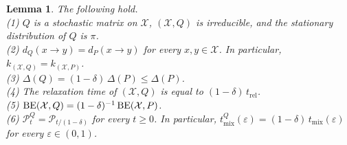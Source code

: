 \documentclass[a4paper, reqno, 11pt]{amsart}
\newtheorem{Lem}[Thm]{Lemma}
\theoremstyle{definition}
\begin{document}
\begin{Lem}\label{lem:lazy-comparison}
The following hold.\\
(1) $Q$ is a stochastic matrix on $\mathcal{X}$, $(\mathcal{X}, Q)$ is irreducible, and the stationary distribution of $Q$ is $\pi$.\\
(2) $d_{Q}(x \to y) = d_{P}(x \to y)$ for every $x, y \in \mathcal{X}$. In particular, $k_{(\mathcal{X}, Q)} = k_{(\mathcal{X}, P)}$.\\
(3) $\Delta(Q) = (1-\delta)\,\Delta(P) \le \Delta(P)$.\\
(4) The relaxation time of $(\mathcal{X}, Q)$ is equal to $(1-\delta)\,t_{\mathrm{rel}}$.\\
(5) $\textup{BE}(\mathcal{X}, Q) = (1-\delta)^{-1}\,\textup{BE}(\mathcal{X}, P)$.\\
(6) $\mathscr{P}_t^{Q} = \mathscr{P}_{t/(1-\delta)}$ for every $t \ge 0$. In particular, $t_{\mathrm{mix}}^{Q}(\varepsilon) = (1-\delta)\,t_{\mathrm{mix}}(\varepsilon)$ for every $\varepsilon \in (0,1)$.
\end{Lem}
\end{document}
